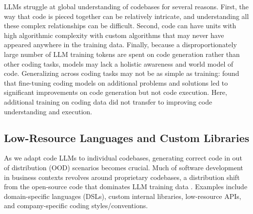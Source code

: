 LLMs struggle at global understanding of codebases for several reasons. First, the way that code is pieced together can be relatively intricate, and understanding all these complex relationships can be difficult. Second, code can have units with high algorithmic complexity with custom algorithms that may never have appeared anywhere in the training data. Finally, because a disproportionately large number of LLM training tokens are spent on code generation rather than other coding tasks, models may lack a holistic awareness and world model of code. Generalizing across coding tasks may not be as simple as training: \citet{gu2024cruxeval} found that fine-tuning coding models on additional problems and solutions led to significant improvements on code generation but not code execution. Here, additional training on coding data did not transfer to improving code understanding and execution.



\vspace{-0.25cm}

\subsection{Low-Resource Languages and Custom Libraries} \label{sec:c-low-resource}

\vspace{-0.2cm}


As we adapt code LLMs to individual codebases, generating correct code in out of distribution (OOD) scenarios becomes crucial. Much of software development in business contexts revolves around proprietary codebases, a distribution shift from the open-source code that dominates LLM training data  \citep{ahmed2024studying}. Examples include domain-specific languages (DSLs), custom internal libraries, low-resource APIs, and company-specific coding styles/conventions.

